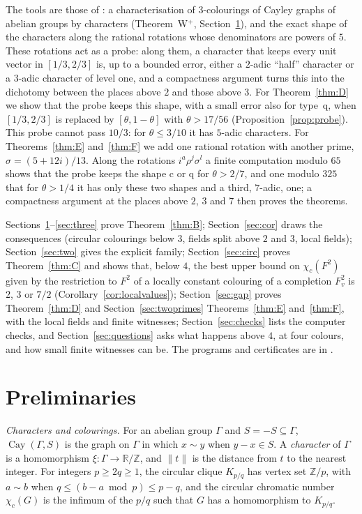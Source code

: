 \documentclass[11pt,a4paper]{amsart}
\theoremstyle{remark}
\newcommand{\R}{\mathbb{R}}
\newcommand{\Z}{\mathbb{Z}}
\newcommand{\Cay}{\operatorname{Cay}}
\begin{document}
The tools are those of \cite{FC}: a characterisation of $3$-colourings of Cayley graphs of abelian groups by
characters (Theorem~W$^+$, Section~\ref{sec:prelim}), and the exact shape of the characters along the rational rotations whose
denominators are powers of $5$. These rotations act as a probe: along them, a character that keeps every unit vector
in $[1/3,2/3]$ is, up to a bounded error, either a $2$-adic ``half'' character or a $3$-adic character of level one,
and a compactness argument turns this into the dichotomy between the places above $2$ and those above $3$. For
Theorem~\ref{thm:D} we show that the probe keeps this shape, with a small error also for type~q, when $[1/3,2/3]$ is
replaced by $[\theta,1-\theta]$ with $\theta>17/56$ (Proposition~\ref{prop:probe}). This probe cannot pass $10/3$:
for $\theta\le3/10$ it has $5$-adic characters. For Theorems~\ref{thm:E} and~\ref{thm:F} we add one rational rotation
with another prime, $\sigma=(5+12i)/13$. Along the rotations $i^a\rho^j\sigma^l$ a finite computation modulo $65$
shows that the probe keeps the shape c or q for $\theta>2/7$, and one modulo $325$ that for $\theta>1/4$ it has only
these two shapes and a third, $7$-adic, one; a compactness argument at the places above $2$, $3$ and $7$ then proves
the theorems.

Sections~\ref{sec:prelim}--\ref{sec:three} prove Theorem~\ref{thm:B}; Section~\ref{sec:cor} draws the consequences
(circular colourings below $3$, fields split above $2$ and $3$, local fields); Section~\ref{sec:two} gives the
explicit family; Section~\ref{sec:circ} proves Theorem~\ref{thm:C} and shows that, below $4$, the best upper bound on
$\chi_c(F^2)$ given by the restriction to $F^2$ of a locally constant colouring of a completion $F_v^2$ is $2$, $3$ or
$7/2$ (Corollary~\ref{cor:localvalues}); Section~\ref{sec:gap} proves Theorem~\ref{thm:D} and
Section~\ref{sec:twoprimes} Theorems~\ref{thm:E} and~\ref{thm:F}, with the local fields and finite witnesses;
Section~\ref{sec:checks} lists the computer checks,
and Section~\ref{sec:questions} asks what happens above $4$, at four colours, and how small finite witnesses can be.
The programs and certificates are in \cite{Repo}.

\section{Preliminaries}\label{sec:prelim}

\emph{Characters and colourings.} For an abelian group $\Gamma$ and $S=-S\subseteq\Gamma$, $\Cay(\Gamma,S)$ is the
graph on $\Gamma$ in which $x\sim y$ when $y-x\in S$. A \emph{character} of $\Gamma$ is a homomorphism
$\xi:\Gamma\to\R/\Z$, and $\|t\|$ is the distance from $t$ to the nearest integer. For integers $p\ge2q\ge1$, the
circular clique $K_{p/q}$ has vertex set $\Z/p$, with $a\sim b$ when $q\le(b-a\bmod p)\le p-q$, and the circular
chromatic number $\chi_c(G)$ is the infimum of the $p/q$ such that $G$ has a homomorphism to $K_{p/q}$.
\end{document}
